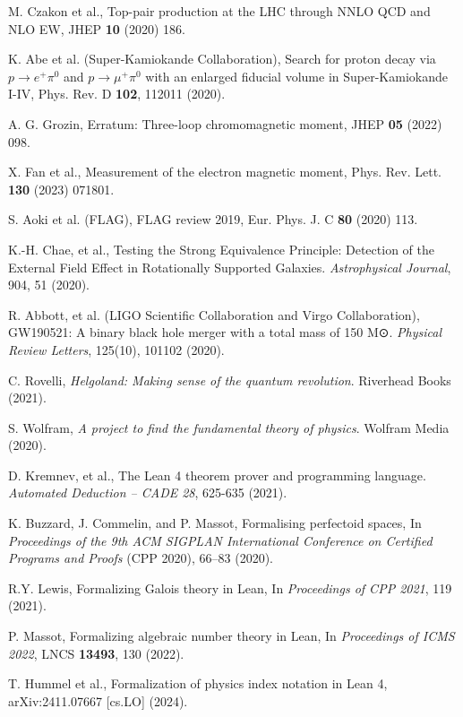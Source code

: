\documentclass[11pt,a4paper]{article}
\begin{document}
\begin{thebibliography}{99}
M. Czakon et al., Top-pair production at the LHC through NNLO QCD and NLO EW, JHEP \textbf{10} (2020) 186.

K. Abe et al. (Super-Kamiokande Collaboration),
Search for proton decay via \(p \to e^+ \pi^0\) and \(p \to \mu^+ \pi^0\) with an enlarged fiducial volume in Super-Kamiokande I-IV,
Phys. Rev. D \textbf{102}, 112011 (2020).

A. G. Grozin, Erratum: Three-loop chromomagnetic moment, JHEP \textbf{05} (2022) 098.

X. Fan et al., Measurement of the electron magnetic moment, Phys. Rev. Lett. \textbf{130} (2023) 071801.

S. Aoki et al. (FLAG), FLAG review 2019, Eur. Phys. J. C \textbf{80} (2020) 113.

K.-H. Chae, et al., Testing the Strong Equivalence Principle: Detection of the External Field Effect in Rotationally Supported Galaxies. \textit{Astrophysical Journal}, 904, 51 (2020).

R. Abbott, et al. (LIGO Scientific Collaboration and Virgo Collaboration), GW190521: A binary black hole merger with a total mass of 150 M⊙. \textit{Physical Review Letters}, 125(10), 101102 (2020).

C. Rovelli, \textit{Helgoland: Making sense of the quantum revolution}. Riverhead Books (2021).

S. Wolfram, \textit{A project to find the fundamental theory of physics}. Wolfram Media (2020).

D. Kremnev, et al., The Lean 4 theorem prover and programming language. \textit{Automated Deduction – CADE 28}, 625-635 (2021).

K. Buzzard, J. Commelin, and P. Massot,
Formalising perfectoid spaces,
In \textit{Proceedings of the 9th ACM SIGPLAN International Conference on Certified Programs and Proofs} (CPP 2020), 66--83 (2020).

R.Y. Lewis, Formalizing Galois theory in Lean, In \textit{Proceedings of CPP 2021}, 119 (2021).

P. Massot, Formalizing algebraic number theory in Lean, In \textit{Proceedings of ICMS 2022}, LNCS \textbf{13493}, 130 (2022).

T. Hummel et al., Formalization of physics index notation in Lean 4, arXiv:2411.07667 [cs.LO] (2024).


\end{thebibliography}
\end{document}
